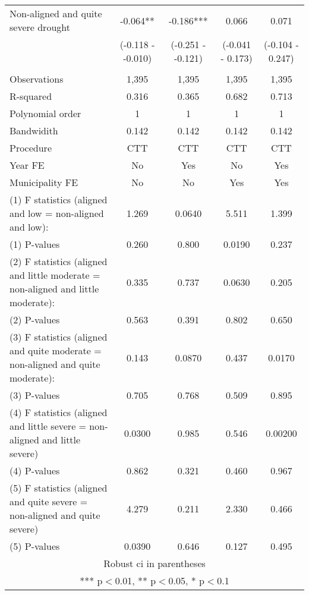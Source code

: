 \begin{tabular}{lcccc}
Non-aligned and quite severe drought & -0.064** & -0.186*** & 0.066 & 0.071 \\
 & (-0.118 - -0.010) & (-0.251 - -0.121) & (-0.041 - 0.173) & (-0.104 - 0.247) \\
 &  &  &  &  \\
Observations & 1,395 & 1,395 & 1,395 & 1,395 \\
R-squared & 0.316 & 0.365 & 0.682 & 0.713 \\
Polynomial order & 1 & 1 & 1 & 1 \\
Bandwidith & 0.142 & 0.142 & 0.142 & 0.142 \\
Procedure & CTT & CTT & CTT & CTT \\
Year FE & No & Yes & No & Yes \\
Municipality FE & No & No & Yes & Yes \\
(1) F statistics (aligned and low = non-aligned and low): & 1.269 & 0.0640 & 5.511 & 1.399 \\
(1) \hspace{1mm} P-values & 0.260 & 0.800 & 0.0190 & 0.237 \\
(2) F statistics (aligned and little moderate = non-aligned and little moderate): & 0.335 & 0.737 & 0.0630 & 0.205 \\
(2) \hspace{1mm} P-values & 0.563 & 0.391 & 0.802 & 0.650 \\
(3) F statistics (aligned and quite moderate = non-aligned and quite moderate): & 0.143 & 0.0870 & 0.437 & 0.0170 \\
(3) \hspace{1mm} P-values & 0.705 & 0.768 & 0.509 & 0.895 \\
(4) F statistics (aligned and little severe = non-aligned and little severe) & 0.0300 & 0.985 & 0.546 & 0.00200 \\
(4) \hspace{1mm} P-values & 0.862 & 0.321 & 0.460 & 0.967 \\
(5) F statistics (aligned and quite severe = non-aligned and quite severe) & 4.279 & 0.211 & 2.330 & 0.466 \\
 (5) \hspace{1mm} P-values & 0.0390 & 0.646 & 0.127 & 0.495 \\ \hline
\multicolumn{5}{c}{ Robust ci in parentheses} \\
\multicolumn{5}{c}{ *** p$<$0.01, ** p$<$0.05, * p$<$0.1} \\
\end{tabular}

